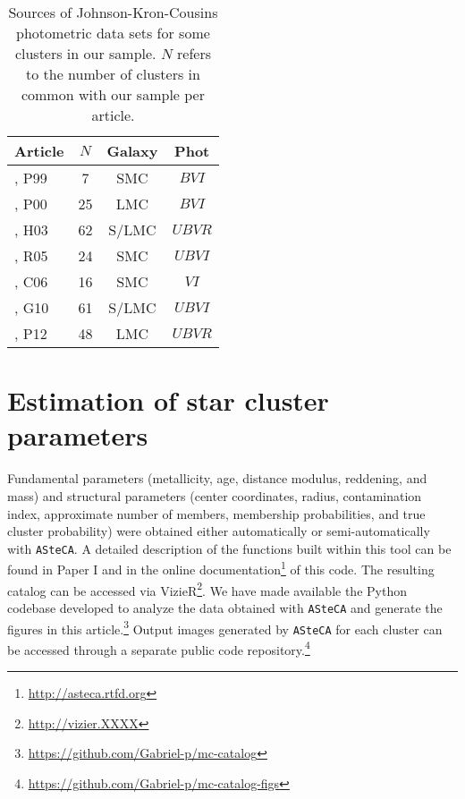 \documentclass{aa}
\begin{document}
\begin{table}
\centering
  \caption{Sources of Johnson-Kron-Cousins photometric data sets for some
  clusters in our sample. $N$ refers to the number of clusters in common with
  our sample per article.}
\label{tab:databases}
 \begin{tabular}{l c c c}
\hline\hline
Article & $N$ & Galaxy & Phot\\
\hline
\cite{Pietrzynski1999}, P99 & 7 & SMC & $BVI$ \\ 
\cite{Pietrzynski2000}, P00 & 25 & LMC & $BVI$ \\ 
\cite{Hunter_2003}, H03 & 62 & S/LMC & $UBVR$ \\ 
\cite{Rafelski_2005}, R05 & 24 & SMC & $UBVI$ \\ 
\cite{Chiosi_2006}, C06 & 16 & SMC & $VI$ \\ 
\cite{Glatt_2010}, G10 & 61 & S/LMC & $UBVI$ \\ 
\cite{Popescu_2012}, P12 & 48 & LMC & $UBVR$ \\ 
\hline
 \end{tabular} 
\end{table}
  




\section{Estimation of star cluster parameters}
\label{sec:fund-params}

Fundamental parameters (metallicity, age, distance modulus, reddening, and mass)
and structural parameters (center coordinates, radius, contamination index,
approximate number of members, membership probabilities, and true cluster
probability) were obtained either automatically or semi-automatically with
\texttt{ASteCA}.
%
A detailed description of the functions built within this tool can be found in
Paper I and in the online
documentation\footnote{\url{http://asteca.rtfd.org}} of this code.
%
The resulting catalog can be accessed via
VizieR\footnote{\url{http://vizier.XXXX}}.
We have made available the Python codebase developed to analyze
the data obtained with \texttt{ASteCA} and generate the figures in this
article.\footnote{\url{https://github.com/Gabriel-p/mc-catalog}}
%
Output images generated by \texttt{ASteCA} for each cluster can be
accessed through a separate public code
repository.\footnote{\url{https://github.com/Gabriel-p/mc-catalog-figs}}
\end{document}
